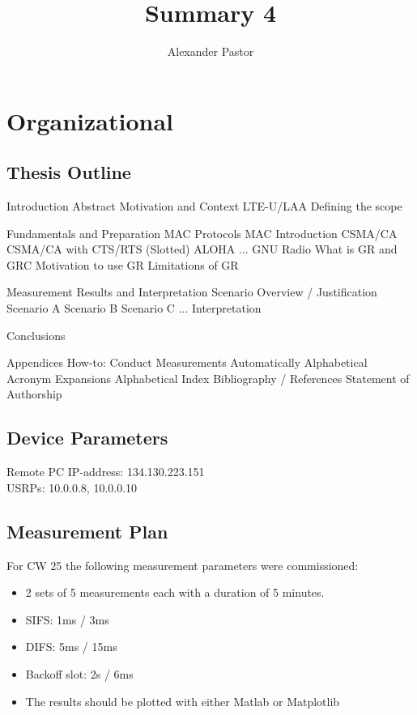 \documentclass{article}
\begin{document}
	
\title{Summary 4}
\author{Alexander Pastor}
\maketitle
\tableofcontents
\newpage

\section{Organizational}

\subsection{Thesis Outline}

\begin{outline}[enumerate]
	\1 Introduction
		\2 Abstract
		\2 Motivation and Context
			\3 LTE-U/LAA 
			\3 Defining the scope
		
	\1 Fundamentals and Preparation
		\2 MAC Protocols
			\3 MAC Introduction
		 	\3 CSMA/CA
		 	\3 CSMA/CA with CTS/RTS
		 	\3 (Slotted) ALOHA
		 	\3 ...
		\2 GNU Radio 
			\3 What is GR and GRC
			\3 Motivation to use GR
			\3 Limitations of GR
	
	\1 Measurement Results and Interpretation
		\2 Scenario Overview / Justification
		\2 Scenario A
		\2 Scenario B
		\2 Scenario C
		\2 ...
		\2 Interpretation
		
	\1 Conclusions
	
	\1 Appendices
		\2 How-to: Conduct Measurements Automatically
		\2 Alphabetical Acronym Expansions
		\2 Alphabetical Index
		\2 Bibliography / References
		\2 Statement of Authorship
\end{outline}

\subsection{Device Parameters}

Remote PC IP-address: 134.130.223.151 \\
USRPs: 10.0.0.8, 10.0.0.10

\subsection{Measurement Plan}

For CW 25 the following measurement parameters were commissioned:

\begin{itemize}
	\item 2 sets of 5 measurements each with a duration of 5 minutes.
	\item SIFS: 1ms / 3ms 
	\item DIFS: 5ms  / 15ms 
	\item Backoff slot: 2s / 6ms
	\item The results should be plotted with either Matlab or Matplotlib
\end{itemize}
\end{document}
